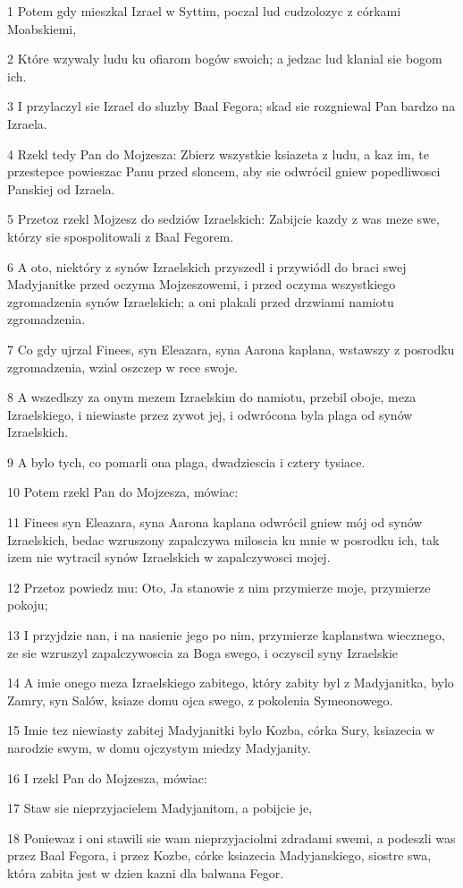 \par 1 Potem gdy mieszkal Izrael w Syttim, poczal lud cudzolozyc z córkami Moabskiemi,
\par 2 Które wzywaly ludu ku ofiarom bogów swoich; a jedzac lud klanial sie bogom ich.
\par 3 I przylaczyl sie Izrael do sluzby Baal Fegora; skad sie rozgniewal Pan bardzo na Izraela.
\par 4 Rzekl tedy Pan do Mojzesza: Zbierz wszystkie ksiazeta z ludu, a kaz im, te przestepce powieszac Panu przed sloncem, aby sie odwrócil gniew popedliwosci Panskiej od Izraela.
\par 5 Przetoz rzekl Mojzesz do sedziów Izraelskich: Zabijcie kazdy z was meze swe, którzy sie spospolitowali z Baal Fegorem.
\par 6 A oto, niektóry z synów Izraelskich przyszedl i przywiódl do braci swej Madyjanitke przed oczyma Mojzeszowemi, i przed oczyma wszystkiego zgromadzenia synów Izraelskich; a oni plakali przed drzwiami namiotu zgromadzenia.
\par 7 Co gdy ujrzal Finees, syn Eleazara, syna Aarona kaplana, wstawszy z posrodku zgromadzenia, wzial oszczep w rece swoje.
\par 8 A wszedlszy za onym mezem Izraelskim do namiotu, przebil oboje, meza Izraelskiego, i niewiaste przez zywot jej, i odwrócona byla plaga od synów Izraelskich.
\par 9 A bylo tych, co pomarli ona plaga, dwadziescia i cztery tysiace.
\par 10 Potem rzekl Pan do Mojzesza, mówiac:
\par 11 Finees syn Eleazara, syna Aarona kaplana odwrócil gniew mój od synów Izraelskich, bedac wzruszony zapalczywa miloscia ku mnie w posrodku ich, tak izem nie wytracil synów Izraelskich w zapalczywosci mojej.
\par 12 Przetoz powiedz mu: Oto, Ja stanowie z nim przymierze moje, przymierze pokoju;
\par 13 I przyjdzie nan, i na nasienie jego po nim, przymierze kaplanstwa wiecznego, ze sie wzruszyl zapalczywoscia za Boga swego, i oczyscil syny Izraelskie
\par 14 A imie onego meza Izraelskiego zabitego, który zabity byl z Madyjanitka, bylo Zamry, syn Salów, ksiaze domu ojca swego, z pokolenia Symeonowego.
\par 15 Imie tez niewiasty zabitej Madyjanitki bylo Kozba, córka Sury, ksiazecia w narodzie swym, w domu ojczystym miedzy Madyjanity.
\par 16 I rzekl Pan do Mojzesza, mówiac:
\par 17 Staw sie nieprzyjacielem Madyjanitom, a pobijcie je,
\par 18 Poniewaz i oni stawili sie wam nieprzyjaciolmi zdradami swemi, a podeszli was przez Baal Fegora, i przez Kozbe, córke ksiazecia Madyjanskiego, siostre swa, która zabita jest w dzien kazni dla balwana Fegor.

